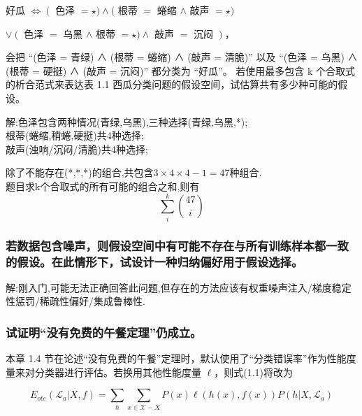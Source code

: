 好瓜 $\Leftrightarrow\left(\right.$ \textnormal{色泽} $=\star)\wedge($ \textnormal{根蒂} $=$ \textnormal{蜷缩} $\wedge$ \textnormal{敲声} $=\star)$

$\vee\left(\right.$ \textnormal{色泽} $=$ \textnormal{乌黑} $\wedge$\textnormal{ 根蒂} $=\star) \wedge$ \textnormal{敲声} $=$ \textnormal{沉闷} $\left.\right)$，

会把 “(色泽 = 青绿) ∧ (根蒂 = 蜷缩) ∧ (敲声 = 清脆)” 以及 “(色泽 = 乌黑) ∧ (根蒂 = 硬挺) ∧ (敲声 = 沉闷)” 都分类为 “好瓜”。
若使用最多包含 k 个合取式的析合范式来表达表 1.1 西瓜分类问题的假设空间，试估算共有多少种可能的假设。

解:色泽包含两种情况(青绿,乌黑),三种选择(青绿,乌黑,*);\\ 根蒂(蜷缩,稍蜷,硬挺)共4种选择;\\ 敲声(浊响/沉闷/清脆)共4种选择;
\par 除了不能存在(*,*,*)的组合,共包含$ 3 \times 4 \times 4 -1 = 47$种组合.\\ 题目求k个合取式的所有可能的组合之和,则有
\begin{equation}
    \boxed{\sum_{i}^{k} \binom{47}{i}}
\end{equation}
\subsubsection{若数据包含噪声，则假设空间中有可能不存在与所有训练样本都一致的假设。在此情形下，试设计一种归纳偏好用于假设选择。}
解:刚入门,可能无法正确回答此问题,但存在的方法应该有权重噪声注入/梯度稳定性惩罚/稀疏性偏好/集成鲁棒性.

\subsubsection{试证明“没有免费的午餐定理”仍成立。}
本章 1.4 节在论述“没有免费的午餐”定理时，默认使用了“分类错误率”作为性能度量来对分类器进行评估。若换用其他性能度量 \( \ell \)，则式(1.1)将改为

\[ E_{ote}(\mathcal{L}_a | X, f) = \sum_h \sum_{x \in \mathcal{X} - X} P(x) \ell(h(x), f(x)) P(h | X, \mathcal{L}_a) \]

